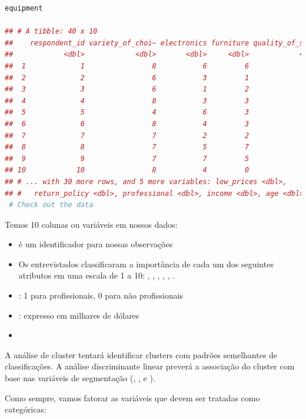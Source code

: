 \documentclass{article}
\begin{document}
\begin{lstlisting}[language=R]
equipment

## # A tibble: 40 x 10
##    respondent_id variety_of_choi~ electronics furniture quality_of_serv~
##            <dbl>            <dbl>       <dbl>     <dbl>            <dbl>
##  1             1                8           6         6                3
##  2             2                6           3         1                4
##  3             3                6           1         2                4
##  4             4                8           3         3                4
##  5             5                4           6         3                9
##  6             6                8           4         3                5
##  7             7                7           2         2                2
##  8             8                7           5         7                2
##  9             9                7           7         5                1
## 10            10                8           4         0                4
## # ... with 30 more rows, and 5 more variables: low_prices <dbl>,
## #   return_policy <dbl>, professional <dbl>, income <dbl>, age <dbl>
 # Check out the data

\end{lstlisting}

Temos 10 colunas ou variáveis em nossos dados:
\begin{itemize}
    \item {} é um identificador para nossas observações
    \item Os entrevistados classificaram a importância de cada um dos seguintes atributos em uma escala de 1 a 10: , , , , , .
    \item {}: 1 para profissionais, 0 para não profissionais
    \item {}: expresso em milhares de dólares
    \item {}
\end{itemize}

A análise de cluster tentará identificar clusters com padrões semelhantes de classificações. A análise discriminante linear preverá a associação do cluster com base nas variáveis de segmentação (, , e ).

Como sempre, vamos fatorar as variáveis que devem ser tratadas como categóricas:
\end{document}
